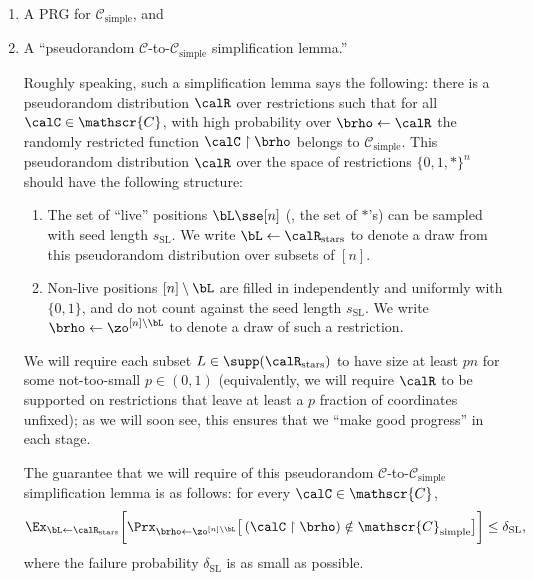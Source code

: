 \documentclass{toc}
\theoremstyle{plain}
\newcommand{\uhr}{\upharpoonright}
\newcommand{\simple}{\mathrm{simple}}
\newcommand{\stars}{\mathrm{stars}}
\newcommand{\SL}{\mathrm{SL}}
\begin{document}
\begin{enumerate}
\item A PRG for $\mathscr{C}_\simple$, and 
\item A ``pseudorandom $\mathscr{C}$-to-$\mathscr{C}_\simple$ simplification lemma.'' 


Roughly speaking, such a simplification lemma says the following: there is a pseudorandom distribution $\calR$ over restrictions such that for all $\calC \in \mathscr{C}$, with high probability over $\brho\leftarrow \calR$ the randomly restricted function $\calC \uhr \brho$ belongs to $\mathscr{C}_\simple$.  This pseudorandom distribution $\calR$ over the space of restrictions $\{0,1,\ast\}^n$ should have the following structure:  
\begin{enumerate}
\item The set of ``live'' positions $\bL \sse [n]$ (\ie, the set of $\ast$'s) can be sampled with seed length $s_\SL$.  We write $\bL \leftarrow \calR_\stars$ to denote a draw from this pseudorandom distribution over subsets of $[n]$. 
\item Non-live positions $[n]\setminus \bL$ are filled in independently and uniformly with $\{0,1\}$, and do not count against the seed length $s_\SL$. We write $\brho\leftarrow \zo^{[n]\setminus \bL}$ to denote a draw of such a restriction.
\end{enumerate} 

We will require each subset $L \in \supp(\calR_\stars)$ to have size at least $pn$ for some not-too-small $p \in (0,1)$ (equivalently, we will require $\calR$ to be supported on restrictions that leave at least a $p$ fraction of coordinates unfixed); as we will soon see, this ensures that we ``make good progress'' in each stage. 


The guarantee that we will require of this pseudorandom $\mathscr{C}$-to-$\mathscr{C}_\simple$ simplification lemma is  as follows: for every $\calC \in \mathscr{C}$, 
\begin{equation} \Ex_{\bL\leftarrow\calR_{\stars}}\bigg[ \Prx_{\brho\leftarrow\zo^{[n]\setminus \bL}}\big[\, (\calC \uhr \brho) \notin \mathscr{C}_\simple\big] \bigg]  \le \delta_\SL, \label{eq:PSL}
\end{equation} 
where the failure probability $\delta_\SL$ is as small as possible.  
\end{enumerate} 
\end{document}
